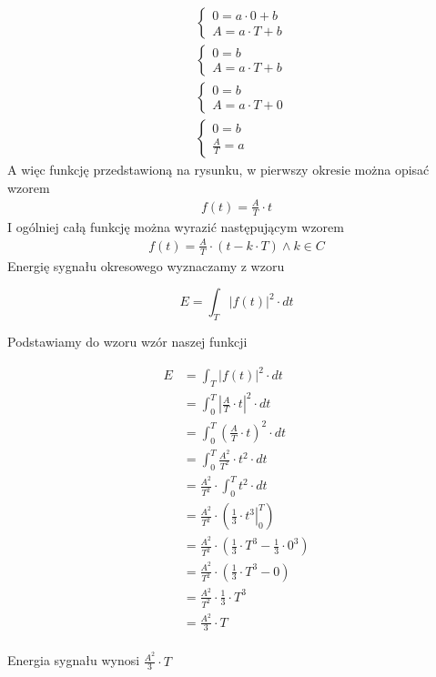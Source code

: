 \begin{task}
\begin{align*}
&\left\{\begin{matrix}
0 = a\cdot 0 +b\\ 
A = a\cdot T +b
\end{matrix}\right. \\
&\left\{\begin{matrix}
0 = b\\ 
A = a\cdot T +b
\end{matrix}\right. \\
&\left\{\begin{matrix}
0 = b\\ 
A = a\cdot T +0
\end{matrix}\right. \\
&\left\{\begin{matrix}
0 = b\\ 
\frac{A}{T} = a
\end{matrix}\right.
\end{align*}
A więc funkcję przedstawioną na rysunku, w pierwszy okresie można opisać wzorem
\begin{align*}
f(t) = \frac{A}{T}\cdot t
\end{align*}
I ogólniej całą funkcję można wyrazić następującym wzorem
\begin{align*}
f(t) = \frac{A}{T}\cdot \left(t-k\cdot T\right) \wedge k \in C
\end{align*}
Energię sygnału okresowego wyznaczamy z wzoru


\begin{equation}
E=\int_{T}^{}\left|f(t)\right|^2 \cdot dt
\end{equation}

Podstawiamy do wzoru wzór naszej funkcji

\begin{align*}
E&=\int_{T}^{}\left|f(t)\right|^2 \cdot dt\\
 &=\int_{0}^{T}\left|\frac{A}{T}\cdot t \right|^2 \cdot dt\\ 
 &=\int_{0}^{T}\left(\frac{A}{T}\cdot t \right)^2 \cdot dt\\ 
 &=\int_{0}^{T}\frac{A^2}{T^2}\cdot t^2 \cdot dt\\ 
 &=\frac{A^2}{T^2}\cdot \int_{0}^{T} t^2 \cdot dt\\ 
 &=\frac{A^2}{T^2}\cdot \left(\left. \frac{1}{3}\cdot t^3 \right|_{0}^{T}\right)\\ 
 &=\frac{A^2}{T^2}\cdot \left(\frac{1}{3}\cdot T^3  - \frac{1}{3}\cdot 0^3 \right)\\
 &=\frac{A^2}{T^2}\cdot \left(\frac{1}{3}\cdot T^3  - 0 \right)\\
 &=\frac{A^2}{T^2}\cdot \frac{1}{3}\cdot T^3\\
 &=\frac{A^2}{3}\cdot T\\
\end{align*}

Energia sygnału wynosi $\frac{A^2}{3}\cdot T$
\end{task}